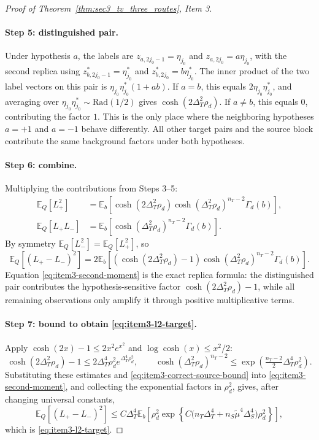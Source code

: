 \documentclass[10pt]{article}
\newcommand{\Ebb}{\mathbb E}
\newcommand{\trg}{T}
\newcommand{\nT}{n_{\trg}}
\newcommand{\DeltaT}{\Delta_{\trg}}
\newcommand{\src}{S}
\newcommand{\nS}{n_{\src}}
\newcommand{\DeltaS}{\Delta_{\src}}
\begin{document}
\begin{proof}[Proof of Theorem~\ref{thm:sec3_tv_three_routes}, Item 3]
\paragraph{Step 5: distinguished pair.}
Under hypothesis $a$, the labels are $z_{a,2j_0-1}=\eta_{j_0}$ and $z_{a,2j_0}=a\eta_{j_0}$, with the second replica using $z_{b,2j_0-1}^*=\eta_{j_0}^*$ and $z_{b,2j_0}^*=b\eta_{j_0}^*$. The inner product of the two label vectors on this pair is $\eta_{j_0}\eta_{j_0}^*(1+ab)$. If $a=b$, this equals $2\eta_{j_0}\eta_{j_0}^*$, and averaging over $\eta_{j_0}\eta_{j_0}^*\sim\mathrm{Rad}(1/2)$ gives $\cosh(2\DeltaT^2\rho_d)$. If $a\neq b$, this equals $0$, contributing the factor $1$.
This is the only place where the neighboring hypotheses $a=+1$ and $a=-1$
behave differently.  All other target pairs and the source block contribute the
same background factors under both hypotheses.

\paragraph{Step 6: combine.}
Multiplying the contributions from Steps 3--5:
\begin{align*}
    \Ebb_Q[L_+^2] &= \Ebb_b\!\left[\cosh(2\DeltaT^2\rho_d)\cosh(\DeltaT^2\rho_d)^{\nT-2}\Gamma_d(b)\right],\\
    \Ebb_Q[L_+L_-] &= \Ebb_b\!\left[\cosh(\DeltaT^2\rho_d)^{\nT-2}\Gamma_d(b)\right].
\end{align*}
By symmetry $\Ebb_Q[L_-^2]=\Ebb_Q[L_+^2]$, so
\begin{equation}
\label{eq:item3-second-moment}
    \Ebb_Q[(L_+-L_-)^2]
    = 2\Ebb_b\!\left[(\cosh(2\DeltaT^2\rho_d)-1)\cosh(\DeltaT^2\rho_d)^{\nT-2}\Gamma_d(b)\right].
\end{equation}
Equation \eqref{eq:item3-second-moment} is the exact replica formula: the
distinguished pair contributes the hypothesis-sensitive factor
$\cosh(2\DeltaT^2\rho_d)-1$, while all remaining observations only amplify it
through positive multiplicative terms.

\paragraph{Step 7: bound to obtain \eqref{eq:item3-l2-target}.}
Apply $\cosh(2x)-1\le 2x^2e^{x^2}$ and $\log\cosh(x)\le x^2/2$:
\[
    \cosh(2\DeltaT^2\rho_d)-1 \le 2\DeltaT^4\rho_d^2 e^{\DeltaT^4\rho_d^2},
    \qquad
    \cosh(\DeltaT^2\rho_d)^{\nT-2}\le\exp\!\left(\tfrac{\nT-2}{2}\DeltaT^4\rho_d^2\right).
\]
Substituting these estimates and
\eqref{eq:item3-correct-source-bound} into
\eqref{eq:item3-second-moment}, and collecting the exponential factors in
$\rho_d^2$, gives, after changing universal constants,
\[
    \Ebb_Q[(L_+-L_-)^2]
    \le
    C\DeltaT^4
    \Ebb_b\!\left[
      \rho_d^2\exp\!\left\{
        C\bigl(\nT\DeltaT^4+\nS\tilde\mu^4\DeltaS^4\bigr)\rho_d^2
      \right\}
    \right],
\]
which is \eqref{eq:item3-l2-target}.

\end{proof}
\end{document}
